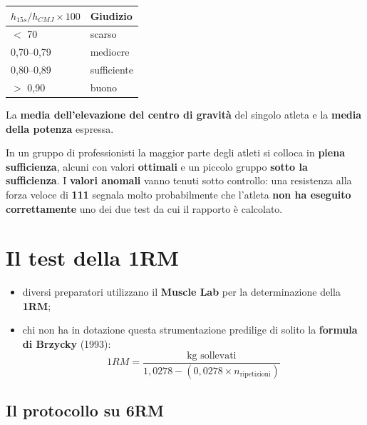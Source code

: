 \begin{table}[htbp]
  \centering
  \small
  \renewcommand{\arraystretch}{1.3}
  \begin{tabularx}{\textwidth}{|l|X|}
    \hline
    \textbf{$h_{15s}/h_{CMJ} \times 100$} & \textbf{Giudizio} \\
    \hline
    $<$ 70 & scarso \\
    \hline
    0,70--0,79 & mediocre \\
    \hline
    0,80--0,89 & sufficiente \\
    \hline
    $>$ 0,90 & buono \\
    \hline
  \end{tabularx}
\end{table}

La \textbf{media dell'elevazione del centro di gravità} del singolo atleta e la \textbf{media della
potenza} espressa.

In un gruppo di professionisti la maggior parte degli atleti si colloca in \textbf{piena
sufficienza}, alcuni con valori \textbf{ottimali} e un piccolo gruppo \textbf{sotto la sufficienza}.
I \textbf{valori anomali} vanno tenuti sotto controllo: una resistenza alla forza veloce di
\textbf{111} segnala molto probabilmente che l'atleta \textbf{non ha eseguito correttamente} uno dei
due test da cui il rapporto è calcolato.

\section{Il test della 1RM}

\begin{itemize}
  \item diversi preparatori utilizzano il \textbf{Muscle Lab} per la determinazione della
    \textbf{1RM};
  \item chi non ha in dotazione questa strumentazione predilige di solito la \textbf{formula di
    Brzycky} (1993):
    \[
      1RM = \frac{\textrm{kg sollevati}}{1{,}0278 - (0{,}0278 \times n_{\textrm{ripetizioni}})}
    \]
\end{itemize}

\subsection{Il protocollo su 6RM}

